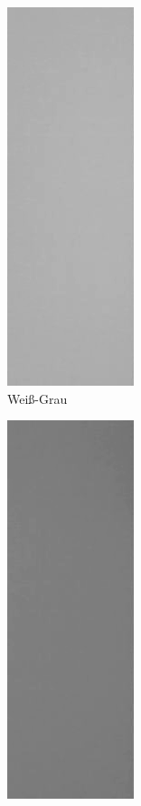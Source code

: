 \documentclass[12pt, oneside, a4paper, \docLanguage]{report}
\begin{document}
\begin{figure}[H]
\begin{subfigure}{.35\textwidth}
  \includegraphics[width=.35\linewidth]{../whiteGreySlice.png}
  \caption{Weiß-Grau}
  \label{fig:sub2}
\end{subfigure}
\begin{subfigure}{.35\textwidth}
  \centering
  \includegraphics[width=.35\linewidth]{../greySlice.png}

\end{subfigure}
\end{figure}
\end{document}
